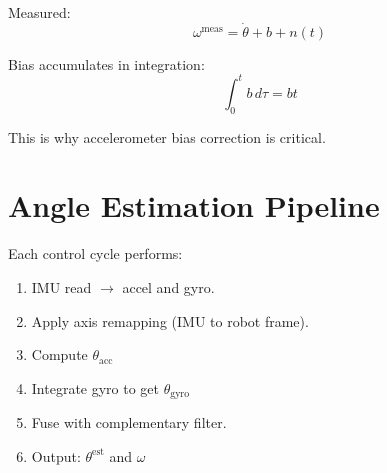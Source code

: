 \documentclass[11pt,a4paper]{article}
\begin{document}
Measured:
\[
\omega^{\text{meas}} = \dot{\theta} + b + n(t)
\]

Bias accumulates in integration:
\[
\int_0^t b \, d\tau = bt
\]

This is why accelerometer bias correction is critical.

\section{Angle Estimation Pipeline}

Each control cycle performs:

\begin{enumerate}
    \item IMU read $\rightarrow$ accel and gyro.
    \item Apply axis remapping (IMU to robot frame).
    \item Compute $\theta_{\text{acc}}$
    \item Integrate gyro to get $\theta_{\text{gyro}}$
    \item Fuse with complementary filter.
    \item Output: $\theta^{\text{est}}$ and $\omega$
\end{enumerate}
\end{document}

